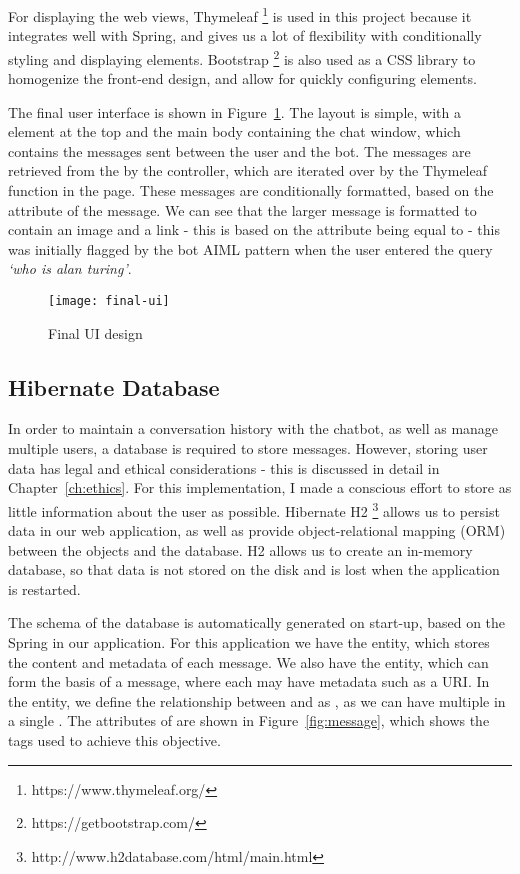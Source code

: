 For displaying the web views, Thymeleaf \footnote{https://www.thymeleaf.org/} is used in this project because it integrates well with Spring, and gives us a lot of flexibility with conditionally styling and displaying elements. Bootstrap \footnote{https://getbootstrap.com/} is also used as a CSS library to homogenize the front-end design, and allow for quickly configuring elements.

The final user interface is shown in Figure~\ref{fig:final-ui}. The layout is simple, with a  element at the top and the main body containing the chat window, which contains the messages sent between the user and the bot. The messages are retrieved from the  by the controller, which are iterated over by the Thymeleaf function in the  page. These messages are conditionally formatted, based on the  attribute of the message. We can see that the larger message is formatted to contain an image and a link - this is based on the  attribute being equal to  - this was initially flagged by the bot AIML pattern when the user entered the query {\it`who is alan turing'}.

\begin{figure}[h]
	\centering
	\texttt{[image: final-ui]}
	\caption{Final UI design}
	\label{fig:final-ui}
\end{figure}

\newpage
\subsection{Hibernate Database}
In order to maintain a conversation history with the chatbot, as well as manage multiple users, a database is required to store messages. However, storing user data has legal and ethical considerations - this is discussed in detail in Chapter~\ref{ch:ethics}. For this implementation, I made a conscious effort to store as little information about the user as possible. Hibernate H2 \footnote{http://www.h2database.com/html/main.html} allows us to persist data in our web application, as well as provide object-relational mapping (ORM) between the objects and the database. H2 allows us to create an in-memory database, so that data is not stored on the disk and is lost when the application is restarted.

The schema of the database is automatically generated on start-up, based on the Spring  in our application. For this application we have the  entity, which stores the content and metadata of each message. We also have the  entity, which can form the basis of a  message, where each  may have metadata such as a URI. In the  entity, we define the relationship between  and  as , as we can have multiple  in a single . The attributes of  are shown in Figure~\ref{fig:message}, which shows the tags used to achieve this objective.

